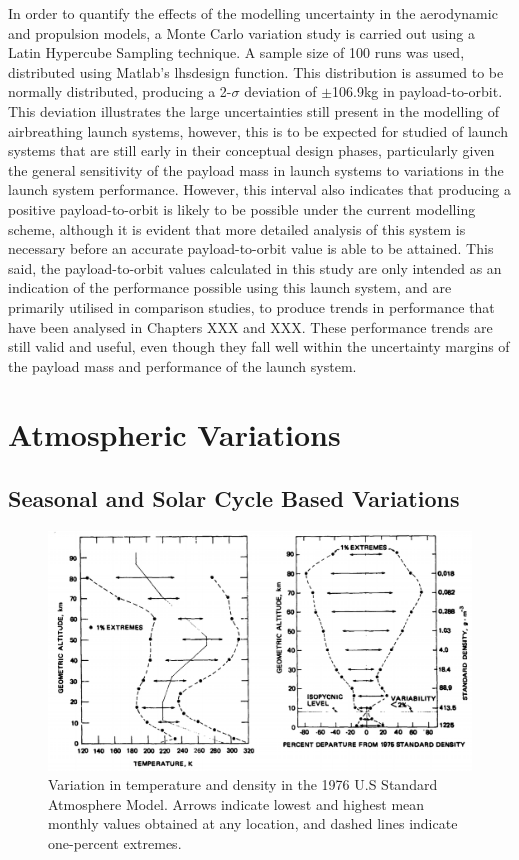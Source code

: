 In order to quantify the effects of the modelling uncertainty in the aerodynamic and propulsion models, a Monte Carlo variation study is carried out using a Latin Hypercube Sampling technique. A sample size of 100 runs was used, distributed using Matlab's \textsf{lhsdesign} function. This distribution is assumed to be normally distributed, producing a 2-$\sigma$ deviation of $\pm$106.9kg in payload-to-orbit. This deviation illustrates the large uncertainties still present in the modelling of airbreathing launch systems, however, this is to be expected for studied of launch systems that are still early in their conceptual design phases, particularly given the general sensitivity of the payload mass in launch systems to variations in the launch system performance. However, this interval also indicates that producing a positive payload-to-orbit is likely to be possible under the current modelling scheme, although it is evident that more detailed analysis of this system is necessary before an accurate payload-to-orbit value is able to be attained. This said, the payload-to-orbit values calculated in this study are only intended as an indication of the performance possible using this launch system, and are primarily utilised in comparison studies, to produce trends in performance that have been analysed in Chapters XXX and XXX. These performance trends are still valid and useful, even though they fall well within the uncertainty margins of the payload mass and performance of the launch system.




\section{Atmospheric Variations}
\subsection{Seasonal and Solar Cycle Based Variations}

\begin{figure}[ht]
	\centering
	\includegraphics[width=0.8\linewidth]{figures/A1_uncertainty-analysis/AtmosphericVariation}
	\caption{Variation in temperature and density in the 1976 U.S Standard Atmosphere Model\cite{Administration1976}. Arrows indicate lowest and highest mean monthly values obtained at any location, and dashed lines indicate one-percent extremes.}
	\label{fig:AtmosphericVariation}
\end{figure}

